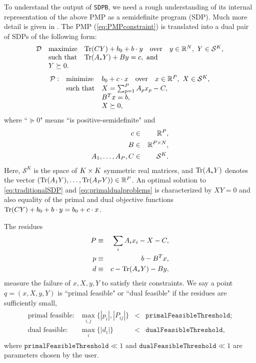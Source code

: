 \documentclass[12pt]{article}
\numberwithin{equation}{section}
\renewcommand{\be}{\begin{eqnarray}}
\renewcommand{\ee}{\end{eqnarray}}
\newcommand\nn\nonumber
\newcommand\cS{\mathcal{S}}
\newcommand\SDPB{\texttt{SDPB}}
\begin{document}
To understand the output of \SDPB, we need a rough understanding of its internal representation of the above PMP as a semidefinite program (SDP).  Much more detail is given in \cite{DSD}.
The PMP (\ref{eq:PMPconstraint}) is translated into a dual pair of SDPs of the following form:
\be
\label{eq:traditionalSDP}
\begin{array}{rll}
\cD & \textrm{maximize} & \Tr(CY) + b_0 + b \. y \quad \textrm{over} \quad y\in \R^N,\ Y\in \cS^K, \\
& \textrm{such that} & \Tr(A_* Y)+By = c,\ \textrm{and}\\
& Y \succeq 0.
\end{array}
\ee 
\be
\label{eq:primaldualproblems}
\begin{array}{rll}
\mathcal{P}: & \textrm{minimize} & b_0+c\.x \quad \textrm{over}\quad x\in \R^P,\ X\in \cS^K,\\
& \textrm{such that} & X= \sum_{p=1}^P A_p x_p - C,\\
& &  B^T x= b,\\
& &  X\succeq 0,
\end{array}
\ee
where ``$\succeq 0$" means ``is positive-semidefinite" and
\be
c &\in& \R^P, \nn\\
B &\in& \R^{P\x N}, \nn\\
A_1,\dots,A_P,C &\in& \cS^K.
\ee
Here, $\cS^K$ is the space of $K\times K$ symmetric real matrices, and $\mathrm{Tr}(A_* Y)$ denotes the vector $(\mathrm{Tr}(A_1 Y),\dots,\mathrm{Tr}(A_P Y))\in\mathbb{R}^P$.  An optimal solution to \ref{eq:traditionalSDP} and \ref{eq:primaldualproblems} is characterized by $XY=0$ and also equality of the primal and dual objective functions $\mathrm{Tr}(CY)+b_0+b\cdot y=b_0+c\cdot x$.

The residues
\be
\label{eq:residues}
P &\equiv& \sum_i A_i x_i - X - C, \nn\\
p &\equiv& b - B^T x, \nn\\
d &\equiv& c - \Tr(A_* Y) - B y,
\ee
measure the failure of $x,X,y,Y$ to satisfy their constraints.  We say a point $q=(x,X,y,Y)$ is ``primal feasible" or ``dual feasible" if the residues are sufficiently small, 
\be
\begin{array}{rrcl}
\textrm{primal feasible:} & \max_{i,j}\{|p_i|, |P_{ij}|\} &<& \texttt{primalFeasibleThreshold};\\
\textrm{dual feasible:} & \max_i\{|d_i|\} &<& \texttt{dualFeasibleThreshold},
\end{array}
\ee
where $\texttt{primalFeasibleThreshold}\ll 1$ and $\texttt{dualFeasibleThreshold} \ll 1$ are parameters chosen by the user.
\end{document}
